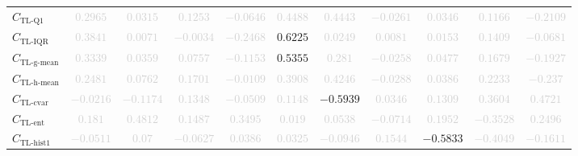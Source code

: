 \documentclass{standalone}
\newcommand{\tlqonename}{\text{TL-Q1}}
\newcommand{\tlqone}{C_{\tlqonename}}
\newcommand{\tliqrname}{\text{TL-IQR}}
\newcommand{\tliqr}{C_{\tliqrname}}
\newcommand{\tlgmeanname}{\text{TL-g-mean}}
\newcommand{\tlgmean}{C_{\tlgmeanname}}
\newcommand{\tlhmeanname}{\text{TL-h-mean}}
\newcommand{\tlhmean}{C_{\tlhmeanname}}
\newcommand{\tlcvariationname}{\text{TL-cvar}}
\newcommand{\tlcvariation}{C_{\tlcvariationname}}
\newcommand{\tlentropyname}{\text{TL-ent}}
\newcommand{\tlentropy}{C_{\tlentropyname}}
\newcommand{\tlhistonename}{\text{TL-hist1}}
\newcommand{\tlhistone}{C_{\tlhistonename}}
\begin{document}
\begin{tabular}{lcccccccccc}
$\tlqone$ & \textcolor{lightgray}{$0.2965$} & \textcolor{lightgray}{$0.0315$} & \textcolor{lightgray}{$0.1253$} & \textcolor{lightgray}{$-0.0646$} & \textcolor{lightgray}{$0.4488$} & \textcolor{lightgray}{$0.4443$} & \textcolor{lightgray}{$-0.0261$} & \textcolor{lightgray}{$0.0346$} & \textcolor{lightgray}{$0.1166$} & \textcolor{lightgray}{$-0.2109$} \\ 
$\tliqr$ & \textcolor{lightgray}{$0.3841$} & \textcolor{lightgray}{$0.0071$} & \textcolor{lightgray}{$-0.0034$} & \textcolor{lightgray}{$-0.2468$} & $0.6225$ & \textcolor{lightgray}{$0.0249$} & \textcolor{lightgray}{$0.0081$} & \textcolor{lightgray}{$0.0153$} & \textcolor{lightgray}{$0.1409$} & \textcolor{lightgray}{$-0.0681$} \\ 
$\tlgmean$ & \textcolor{lightgray}{$0.3339$} & \textcolor{lightgray}{$0.0359$} & \textcolor{lightgray}{$0.0757$} & \textcolor{lightgray}{$-0.1153$} & $0.5355$ & \textcolor{lightgray}{$0.281$} & \textcolor{lightgray}{$-0.0258$} & \textcolor{lightgray}{$0.0477$} & \textcolor{lightgray}{$0.1679$} & \textcolor{lightgray}{$-0.1927$} \\ 
$\tlhmean$ & \textcolor{lightgray}{$0.2481$} & \textcolor{lightgray}{$0.0762$} & \textcolor{lightgray}{$0.1701$} & \textcolor{lightgray}{$-0.0109$} & \textcolor{lightgray}{$0.3908$} & \textcolor{lightgray}{$0.4246$} & \textcolor{lightgray}{$-0.0288$} & \textcolor{lightgray}{$0.0386$} & \textcolor{lightgray}{$0.2233$} & \textcolor{lightgray}{$-0.237$} \\ 
$\tlcvariation$ & \textcolor{lightgray}{$-0.0216$} & \textcolor{lightgray}{$-0.1174$} & \textcolor{lightgray}{$0.1348$} & \textcolor{lightgray}{$-0.0509$} & \textcolor{lightgray}{$0.1148$} & $-0.5939$ & \textcolor{lightgray}{$0.0346$} & \textcolor{lightgray}{$0.1309$} & \textcolor{lightgray}{$0.3604$} & \textcolor{lightgray}{$0.4721$} \\ 
$\tlentropy$ & \textcolor{lightgray}{$0.181$} & \textcolor{lightgray}{$0.4812$} & \textcolor{lightgray}{$0.1487$} & \textcolor{lightgray}{$0.3495$} & \textcolor{lightgray}{$0.019$} & \textcolor{lightgray}{$0.0538$} & \textcolor{lightgray}{$-0.0714$} & \textcolor{lightgray}{$0.1952$} & \textcolor{lightgray}{$-0.3528$} & \textcolor{lightgray}{$0.2496$} \\ 
$\tlhistone$ & \textcolor{lightgray}{$-0.0511$} & \textcolor{lightgray}{$0.07$} & \textcolor{lightgray}{$-0.0627$} & \textcolor{lightgray}{$0.0386$} & \textcolor{lightgray}{$0.0325$} & \textcolor{lightgray}{$-0.0946$} & \textcolor{lightgray}{$0.1544$} & $-0.5833$ & \textcolor{lightgray}{$-0.4049$} & \textcolor{lightgray}{$-0.1611$} \\ 

\end{tabular}
\end{document}
